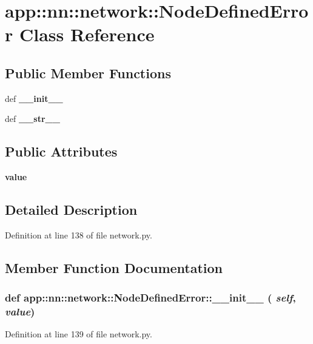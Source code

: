 \section{app::nn::network::NodeDefinedError Class Reference}
\label{classapp_1_1nn_1_1network_1_1NodeDefinedError}
\subsection*{Public Member Functions}
\begin{CompactItemize}
\item 
def {\bf \_\-\_\-init\_\-\_\-}
\item 
def {\bf \_\-\_\-str\_\-\_\-}
\end{CompactItemize}
\subsection*{Public Attributes}
\begin{CompactItemize}
\item 
{\bf value}
\end{CompactItemize}


\subsection{Detailed Description}


Definition at line 138 of file network.py.

\subsection{Member Function Documentation}
\subsubsection{\setlength{\rightskip}{0pt plus 5cm}def app::nn::network::NodeDefinedError::\_\-\_\-init\_\-\_\- ( {\em self},  {\em value})}\label{classapp_1_1nn_1_1network_1_1NodeDefinedError_918a6ca690448a38f9b53570ef42799f}




Definition at line 139 of file network.py.
